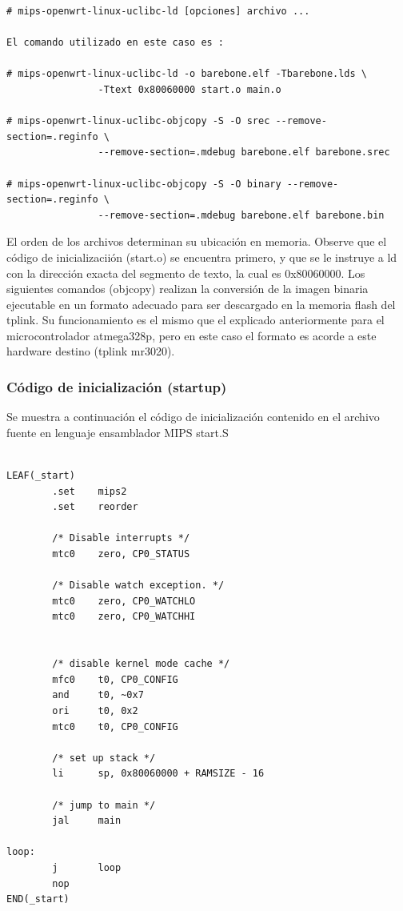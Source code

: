 \documentclass[output=paper, 
colorlinks,
citecolor=brown,
newtxmath
]{langscibook}
\begin{document}
\begin{verbatim}
# mips-openwrt-linux-uclibc-ld [opciones] archivo ...

El comando utilizado en este caso es :

# mips-openwrt-linux-uclibc-ld -o barebone.elf -Tbarebone.lds \
                -Ttext 0x80060000 start.o main.o

# mips-openwrt-linux-uclibc-objcopy -S -O srec --remove-section=.reginfo \
                --remove-section=.mdebug barebone.elf barebone.srec

# mips-openwrt-linux-uclibc-objcopy -S -O binary --remove-section=.reginfo \
                --remove-section=.mdebug barebone.elf barebone.bin
\end{verbatim}


El orden de los archivos determinan su ubicación en memoria. Observe
que el código de inicializaciión (start.o) se encuentra primero, y que
se le instruye a ld con la dirección exacta del segmento de texto,
la cual es 0x80060000. Los siguientes comandos (objcopy) realizan la 
conversión de la imagen binaria ejecutable
en un formato adecuado para ser descargado en la memoria flash del tplink.
Su funcionamiento es el mismo que el explicado anteriormente 
para el microcontrolador atmega328p, pero en este caso el formato
es acorde a este hardware destino (tplink mr3020).


\subsubsection {Código de inicialización (startup)}

Se muestra a continuación el código de inicialización contenido en el archivo
fuente en lenguaje ensamblador MIPS start.S

\begin{verbatim}

LEAF(_start)
        .set    mips2
        .set    reorder

        /* Disable interrupts */
        mtc0    zero, CP0_STATUS

        /* Disable watch exception. */
        mtc0    zero, CP0_WATCHLO
        mtc0    zero, CP0_WATCHHI


        /* disable kernel mode cache */
        mfc0    t0, CP0_CONFIG
        and     t0, ~0x7
        ori     t0, 0x2
        mtc0    t0, CP0_CONFIG

        /* set up stack */
        li      sp, 0x80060000 + RAMSIZE - 16

        /* jump to main */
        jal     main

loop:
        j       loop
        nop
END(_start)
\end{verbatim}
\end{document}
